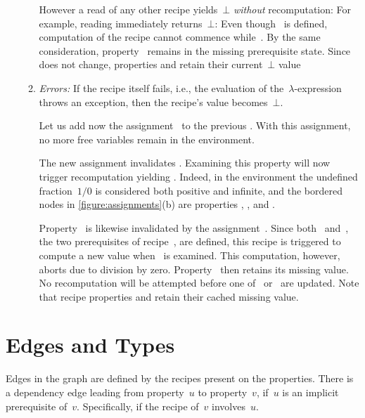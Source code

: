 \begin{enumerate}
\begin{enumerate}
          However a read of any other
          recipe yields~$⊥$ \emph{without} recomputation: For example, reading
           immediately returns~$⊥$: Even though~ is defined,
          computation of the recipe  cannot commence
          while~. By the same consideration, property~ remains
          in the missing prerequisite state. Since~ does not change,
          properties  and  retain their current~$⊥$ value

          \item\emph{Errors:} If the recipe itself fails, i.e., the \Java
          evaluation of the~$λ$-expression throws an exception, then the
          recipe's value becomes~$⊥$.

          Let us add now the assignment~ to the previous .
          With this assignment, no more free variables remain in the
          environment.

          The new assignment invalidates . Examining this property
          will now trigger recomputation yielding . Indeed, in the
           environment the undefined fraction~$1/0$ is considered
          both positive and infinite, and the bordered nodes in
          \cref{figure:assignments}(b) are properties , , 
           and . 

          Property~ is likewise invalidated by the assignment~.
          Since both~ and~, the two prerequisites of
          recipe~, are defined, this recipe is triggered to compute a
          new value when~ is examined. This computation, however, aborts
          due to division by zero. Property~ then retains its missing
          value. No recomputation will be attempted before one of~
          or~ are updated.  Note that recipe properties  and
           retain their cached missing value.
  \end{enumerate}
\end{enumerate}

\section{Edges and Types}

Edges in the graph are defined by the recipes present on the properties. There
is a dependency edge leading from property~$u$ to property~$v$, if~$u$ is an
implicit prerequisite of~$v$. Specifically, if the recipe of~$v$ involves~$u$.

